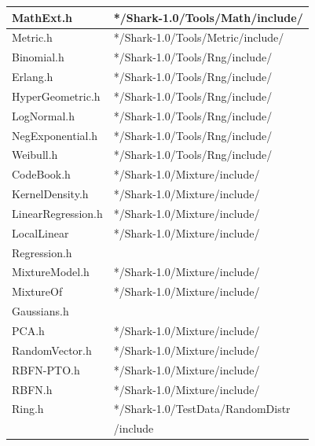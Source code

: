 \documentclass[twocolumn]{article}
\begin{document}
\begin{table}[h]
\begin{center}
{\begin{tabular}{|l|l|}
MathExt.h                  & */Shark-1.0/Tools/Math/include/          \\\hline
Metric.h                   & */Shark-1.0/Tools/Metric/include/        \\\hline
Binomial.h                 & */Shark-1.0/Tools/Rng/include/           \\\hline
Erlang.h                   & */Shark-1.0/Tools/Rng/include/           \\\hline
HyperGeometric.h           & */Shark-1.0/Tools/Rng/include/           \\\hline
LogNormal.h                & */Shark-1.0/Tools/Rng/include/           \\\hline
NegExponential.h           & */Shark-1.0/Tools/Rng/include/           \\\hline
Weibull.h                  & */Shark-1.0/Tools/Rng/include/           \\\hline
CodeBook.h                 & */Shark-1.0/Mixture/include/             \\\hline
KernelDensity.h            & */Shark-1.0/Mixture/include/             \\\hline
LinearRegression.h         & */Shark-1.0/Mixture/include/             \\\hline
LocalLinear                & */Shark-1.0/Mixture/include/             \\
\hspace*{2mm} Regression.h &                                          \\\hline
MixtureModel.h             & */Shark-1.0/Mixture/include/             \\\hline
MixtureOf                  & */Shark-1.0/Mixture/include/             \\
\hspace*{2mm} Gaussians.h  &                                          \\\hline  
PCA.h                      & */Shark-1.0/Mixture/include/             \\\hline
RandomVector.h             & */Shark-1.0/Mixture/include/             \\\hline
RBFN-PTO.h                 & */Shark-1.0/Mixture/include/             \\\hline
RBFN.h                     & */Shark-1.0/Mixture/include/             \\\hline
Ring.h                     & */Shark-1.0/TestData/RandomDistr         \\
                           & \hspace{2mm} /include                    \\\hline

\end{tabular}}
\end{center}
\end{table}
\end{document}
